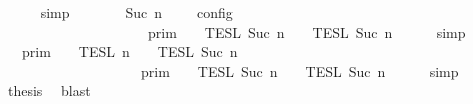 \begin{isabellebody}
\ \ \ \ \isamarkupfalse%
\ simp\isanewline
\ \ \isamarkupfalse%
\ \isamarkupfalse%
\ {\isacartoucheopen}{\isasymlbrakk}\ {\isasymGamma}{\isacharcomma}\ Suc\ n\ {\isasymturnstile}\ {\isasymPhi}\ {\isasymtriangleright}\ {\isacharbrackleft}{\isacharbrackright}\ {\isasymrbrakk}\isactrlsub c\isactrlsub o\isactrlsub n\isactrlsub f\isactrlsub i\isactrlsub g\isanewline
\ \ \ \ \ \ \ \ \ \ \ \ \ \ \ \ \ \ {\isacharequal}\ {\isasymlbrakk}{\isasymlbrakk}\ {\isasymGamma}\ {\isasymrbrakk}{\isasymrbrakk}\isactrlsub p\isactrlsub r\isactrlsub i\isactrlsub m\ {\isasyminter}\ {\isasymlbrakk}{\isasymlbrakk}\ {\isasymPhi}\ {\isasymrbrakk}{\isasymrbrakk}\isactrlsub T\isactrlsub E\isactrlsub S\isactrlsub L\isactrlbsup {\isasymge}\ Suc\ n\isactrlesup \ {\isasyminter}\ {\isasymlbrakk}{\isasymlbrakk}\ {\isacharbrackleft}{\isacharbrackright}\ {\isasymrbrakk}{\isasymrbrakk}\isactrlsub T\isactrlsub E\isactrlsub S\isactrlsub L\isactrlbsup {\isasymge}\ Suc\ n\isactrlesup {\isacartoucheclose}\isanewline
\ \ \ \ \isamarkupfalse%
\ simp\isanewline
\ \ \isamarkupfalse%
\ \isamarkupfalse%
\ {\isacartoucheopen}{\isasymlbrakk}{\isasymlbrakk}\ {\isasymGamma}\ {\isasymrbrakk}{\isasymrbrakk}\isactrlsub p\isactrlsub r\isactrlsub i\isactrlsub m\ {\isasyminter}\ {\isasymlbrakk}{\isasymlbrakk}\ {\isacharbrackleft}{\isacharbrackright}\ {\isasymrbrakk}{\isasymrbrakk}\isactrlsub T\isactrlsub E\isactrlsub S\isactrlsub L\isactrlbsup {\isasymge}\ n\isactrlesup \ {\isasyminter}\ {\isasymlbrakk}{\isasymlbrakk}\ {\isasymPhi}\ {\isasymrbrakk}{\isasymrbrakk}\isactrlsub T\isactrlsub E\isactrlsub S\isactrlsub L\isactrlbsup {\isasymge}\ Suc\ n\isactrlesup \isanewline
\ \ \ \ \ \ \ \ \ \ \ \ \ \ \ \ \ {\isacharequal}\ {\isasymlbrakk}{\isasymlbrakk}\ {\isasymGamma}\ {\isasymrbrakk}{\isasymrbrakk}\isactrlsub p\isactrlsub r\isactrlsub i\isactrlsub m\ {\isasyminter}\ {\isasymlbrakk}{\isasymlbrakk}\ {\isasymPhi}\ {\isasymrbrakk}{\isasymrbrakk}\isactrlsub T\isactrlsub E\isactrlsub S\isactrlsub L\isactrlbsup {\isasymge}\ Suc\ n\isactrlesup \ {\isasyminter}\ {\isasymlbrakk}{\isasymlbrakk}\ {\isacharbrackleft}{\isacharbrackright}\ {\isasymrbrakk}{\isasymrbrakk}\isactrlsub T\isactrlsub E\isactrlsub S\isactrlsub L\isactrlbsup {\isasymge}\ Suc\ n\isactrlesup {\isacartoucheclose}\isanewline
\ \ \ \ \isamarkupfalse%
\ simp\isanewline
\ \ \isamarkupfalse%
\ \isamarkupfalse%
\ {\isacharquery}thesis\ \isamarkupfalse%
\ blast\isanewline
{}\isamarkupfalse%

\end{isabellebody}
